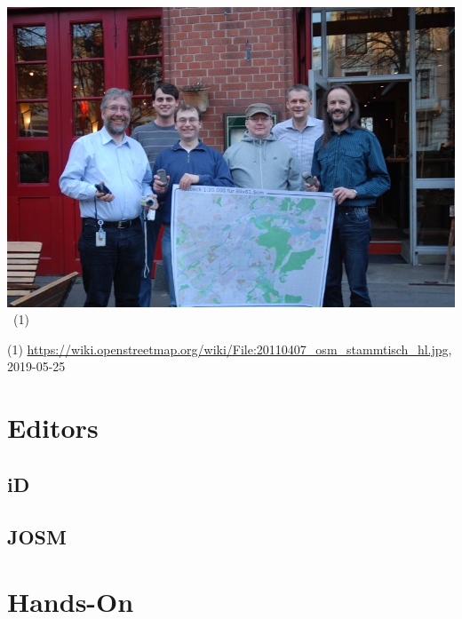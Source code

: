 \documentclass{beamer}
\begin{document}
	\begin{frame}
		\begin{center}
			\includegraphics[width=0.8\linewidth,height=0.8\textheight,keepaspectratio]{images/socializing}~\tiny{(1)}
		\end{center}
		{\tiny (1) \url{https://wiki.openstreetmap.org/wiki/File:20110407_osm_stammtisch_hl.jpg}, 2019-05-25}
	\end{frame}
	
	\section{Editors}
	
	\subsection{iD}
	
	\subsection{JOSM}
	
	\section{Hands-On}
\end{document}
